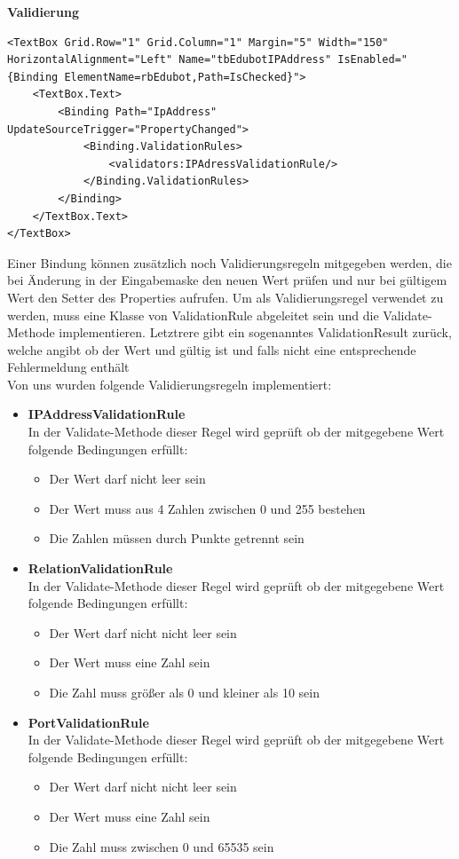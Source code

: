 \textbf{Validierung}\\
\begin{lstlisting}[language = XAML, captionpos=b, caption={IP-Addresse - TextBox mit IPAddressValidationRule}]
<TextBox Grid.Row="1" Grid.Column="1" Margin="5" Width="150" HorizontalAlignment="Left" Name="tbEdubotIPAddress" IsEnabled="{Binding ElementName=rbEdubot,Path=IsChecked}">
	<TextBox.Text>
		<Binding Path="IpAddress" UpdateSourceTrigger="PropertyChanged">
			<Binding.ValidationRules>
				<validators:IPAdressValidationRule/>
			</Binding.ValidationRules>
		</Binding>
	</TextBox.Text>
</TextBox>
\end{lstlisting}
Einer Bindung können zusätzlich noch Validierungsregeln mitgegeben werden, die bei Änderung in der Eingabemaske den neuen Wert prüfen und nur bei gültigem Wert den Setter des Properties aufrufen. Um als Validierungsregel verwendet zu werden, muss eine Klasse von ValidationRule abgeleitet sein und die Validate-Methode implementieren. Letztrere gibt ein sogenanntes ValidationResult zurück, welche angibt ob der Wert und gültig ist und falls nicht eine entsprechende Fehlermeldung enthält\\
Von uns wurden folgende Validierungsregeln implementiert:
\begin{itemize}
\item \textbf{IPAddressValidationRule}\\
In der Validate-Methode dieser Regel wird geprüft ob der mitgegebene Wert folgende Bedingungen erfüllt:
\begin{itemize}
\item Der Wert darf nicht leer sein
\item Der Wert muss aus 4 Zahlen zwischen 0 und 255 bestehen
\item Die Zahlen müssen durch Punkte getrennt sein
\end{itemize}
\item \textbf{RelationValidationRule}\\
In der Validate-Methode dieser Regel wird geprüft ob der mitgegebene Wert folgende Bedingungen erfüllt:
\begin{itemize}
\item Der Wert darf nicht nicht leer sein
\item Der Wert muss eine Zahl sein
\item Die Zahl muss größer als 0 und kleiner als 10 sein
\end{itemize}
\item \textbf{PortValidationRule}\\
In der Validate-Methode dieser Regel wird geprüft ob der mitgegebene Wert folgende Bedingungen erfüllt:
\begin{itemize}
\item Der Wert darf nicht nicht leer sein
\item Der Wert muss eine Zahl sein
\item Die Zahl muss zwischen 0 und 65535 sein
\end{itemize}
\end{itemize}

